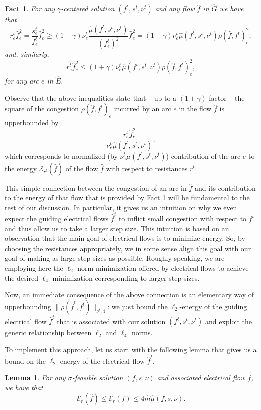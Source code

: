 \documentclass[11pt, letterpaper]{article}
\newtheorem{lemma}[theorem]{Lemma}
\newtheorem{fact}[theorem]{Fact}
\newcommand{\norm}[2]{\|#1\|_{#2}}
\newcommand{\hG}{\widehat{G}}
\newcommand{\hE}{\widehat{E}}
\newcommand{\hm}{\widehat{m}}
\newcommand{\energy}[2]{\mathcal{E}_{#1}(#2)}
\newcommand{\hf}{\hat{f}}
\newcommand{\hmu}{\hat{\mu}}
\newcommand{\vrho}{\boldsymbol{\mathit{\rho}}}
\newcommand{\vnu}{\boldsymbol{\mathit{\nu}}}
\newcommand{\vsigma}{\boldsymbol{\mathit{\sigma}}}
\newcommand{\ff}{\boldsymbol{\mathit{f}}}
\newcommand{\hff}{\boldsymbol{\mathit{\hat{f}}}}
\newcommand{\rr}{\boldsymbol{\mathit{r}}}
\renewcommand{\ss}{\boldsymbol{\mathit{s}}}
\begin{document}
\begin{fact}
\label{fa:rho_vs_rt}
For any $\gamma$-centered solution $(\ff^t,\ss^t,\vnu^t)$ and any flow $\hff$ in $\hG$ we have that
\[
r^t_e \hf^2_e = \frac{s_e^t}{f^t_e} \hf_e^2 \geq (1-\gamma) \nu_e^t \frac{\hmu(\ff^t,\ss^t,\vnu^t)}{(f^t_e)^2} \hf_e^2 = (1-\gamma) \nu_e^t \hmu(\ff^t,\ss^t,\vnu^t) \rho(\hff,\ff^t)_e^2,
\]
and, similarly,
\[
r^t_e \hf^2_e \leq (1+\gamma) \nu_e^t \hmu(\ff^t,\ss^t,\vnu^t) \rho(\hff,\ff^t)_e^2,
\]
for any arc $e$ in $\hE$. 
\end{fact}

Observe that the above inequalities state that -- up to a $(1\pm\gamma)$ factor -- the square of the congestion $\rho(\hff,\ff^t)_e$ incurred by an arc $e$ in the flow $\hff$ is upperbounded by
\[
\frac{r^t_e\hf^2_e}{\nu_e^t \hmu(\ff^t,\ss^t,\vnu^t)},
\]
which corresponds to normalized (by $\nu_e^t \hmu(\ff^t,\ss^t,\vnu^t)$)  contribution of the arc $e$ to the energy $\energy{\rr^t}{\hff}$ of the flow $\hff$ with respect to resistances $\rr^t$.

This simple connection between the congestion of an arc in $\hff$ and its contribution to the energy of that flow that is provided by Fact \ref{fa:rho_vs_rt} will be fundamental to the rest of our discussion. In particular, it gives us an intuition on why we even expect the guiding electrical flows $\hff^t$ to inflict small congestion with respect to $\ff^t$ and thus allow us to take a larger step size. This intuition is based on an observation that the main goal of electrical flows is to minimize energy. So, by choosing the resistances appropriately, we in some sense align this goal with our goal of making as large step sizes as possible. Roughly speaking, we are employing here the $\ell_2$ norm minimization offered by electrical flows to achieve the desired $\ell_4$-minimization corresponding to larger step sizes. 

Now, an immediate consequence of the above connection is an elementary way of upperbounding $\norm{\vrho(\hff^t,\ff^t)}{\vnu^t,4}$: we just bound the $\ell_2$-energy of the guiding electrical flow $\hff^t$ that is associated with our solution $(\ff^t,\ss^t,\vnu^t)$ and exploit the generic relationship between $\ell_2$ and $\ell_4$ norms.  

To implement this approach, let us start with the following lemma that gives us a bound on the $\ell_2$-energy of the electrical flow $\hff^t$. 

\begin{lemma}
\label{lem:hfft_energy_bound}
For any $\vsigma$-feasible solution $(\ff,\ss,\vnu)$ and associated electrical flow $\hff$, we have that
\[
\energy{\rr}{\hff}\leq \energy{\rr}{\ff} \leq 4 \hm \hmu(\ff,\ss,\vnu).
\]
\end{lemma}
\end{document}
